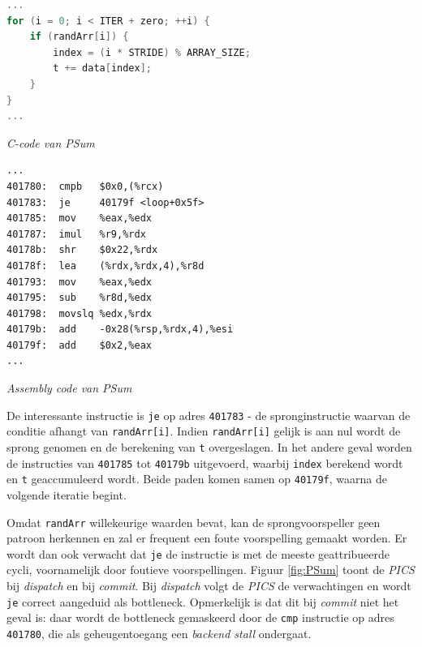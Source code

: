 \documentclass[12pt,a4paper,faculty=ea,language=nl]{ugent-doc}
\begin{document}
\noindent
\begin{minipage}[t]{0.45\textwidth}
\begin{lstlisting}[language=C]
...
for (i = 0; i < ITER + zero; ++i) {
    if (randArr[i]) {
        index = (i * STRIDE) % ARRAY_SIZE;
        t += data[index];
    }
}
...
\end{lstlisting}
\vspace{-1em}
\noindent\textit{\small C-code van PSum}
\end{minipage}
\hfill
\begin{minipage}[t]{0.52\textwidth}
\begin{lstlisting}[morekeywords={cmpb,je,mov,imul,shr,lea,sub,movslq,add,cmp,jnz,rcx,edx,eax,r8d,rsp,esi,edi,r9,rdx}]
...
401780:  cmpb   $0x0,(%rcx)
401783:  je     40179f <loop+0x5f>
401785:  mov    %eax,%edx
401787:  imul   %r9,%rdx
40178b:  shr    $0x22,%rdx
40178f:  lea    (%rdx,%rdx,4),%r8d
401793:  mov    %eax,%edx
401795:  sub    %r8d,%edx
401798:  movslq %edx,%rdx
40179b:  add    -0x28(%rsp,%rdx,4),%esi
40179f:  add    $0x2,%eax
...
\end{lstlisting}
\vspace{-1em}
\noindent\textit{\small Assembly code van PSum}
\end{minipage}

De interessante instructie is \verb|je| op adres \verb|401783| - de spronginstructie waarvan de conditie afhangt van \verb|randArr[i]|. Indien \verb|randArr[i]| gelijk is aan nul wordt de sprong genomen en de berekening van \verb|t| overgeslagen. In het andere geval worden de instructies van \verb|401785| tot \verb|40179b| uitgevoerd, waarbij \verb|index| berekend wordt en \verb|t| geaccumuleerd wordt. Beide paden komen samen op \verb|40179f|, waarna de volgende iteratie begint.

Omdat \verb|randArr| willekeurige waarden bevat, kan de sprongvoorspeller geen patroon herkennen en zal er frequent een foute voorspelling gemaakt worden. Er wordt dan ook verwacht dat \verb|je| de instructie is met de meeste geattribueerde cycli, voornamelijk door foutieve voorspellingen. Figuur \ref{fig:PSum} toont de \textit{PICS} bij \textit{dispatch} en bij \textit{commit}. Bij \textit{dispatch} volgt de \textit{PICS} de verwachtingen en wordt \verb|je| correct aangeduid als bottleneck. Opmerkelijk is dat dit bij \textit{commit} niet het geval is: daar wordt de bottleneck gemaskeerd door de \verb|cmp| instructie op adres \verb|401780|, die als geheugentoegang een \textit{backend stall} ondergaat.
\end{document}
